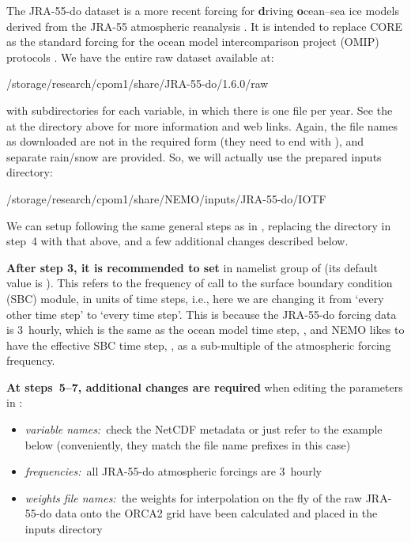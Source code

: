 The \mbox{JRA-55-do} dataset is a more recent forcing for \textbf{d}riving \mbox{\textbf{o}cean--sea} ice models derived from the \mbox{JRA-55} atmospheric reanalysis \citep{kobayashi2015jra-55,tsujino2018jra55do}.
It is intended to replace CORE as the standard forcing for the ocean model intercomparison project (OMIP) protocols \citep{griffies2016omip,tsujino2020evaluation}.
We have the entire raw dataset available at:

\begin{VerbatimFile}
/storage/research/cpom1/share/JRA-55-do/1.6.0/raw
\end{VerbatimFile}

with subdirectories for each variable, in which there is one file per year.
See the  at the directory above for more information and web links.
Again, the file names as downloaded are not in the required form (they need to end with ), and separate rain/snow are provided.
So, we will actually use the prepared inputs directory:

\begin{VerbatimFile}
/storage/research/cpom1/share/NEMO/inputs/JRA-55-do/IOTF
\end{VerbatimFile}

We can setup following the same general steps as in , replacing the directory in step~4 with that above, and a few additional changes described below.

\textbf{After step 3, it is recommended to set}  in namelist group  of  (its default value is ).
This refers to the frequency of call to the surface boundary condition (SBC) module, in units of time steps, i.e., here we are changing it from `every other time step' to `every time step'.
This is because the \mbox{JRA-55-do} forcing data is 3~hourly, which is the same as the ocean model time step, , and NEMO likes to have the effective SBC time step, \texttimes{}, as a sub-multiple of the atmospheric forcing frequency.

\textbf{At steps~\mbox{5--7}, additional changes are required} when editing the  parameters in :

\begin{itemize}
    \item\textit{variable names:}~check the NetCDF metadata or just refer to the example below (conveniently, they match the file name prefixes in this case)
    \item\textit{frequencies:}~all \mbox{JRA-55-do} atmospheric forcings are 3~hourly
    \item\textit{weights file names:}~the weights for interpolation on the fly of the raw \mbox{JRA-55-do} data onto the ORCA2 grid have been calculated and placed in the inputs directory
\end{itemize}

